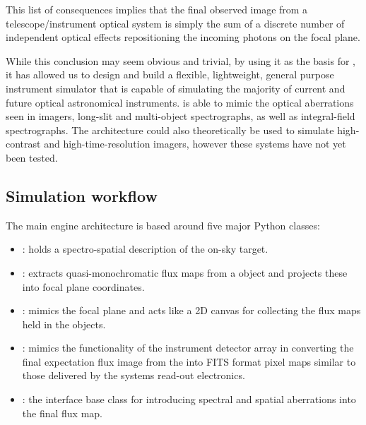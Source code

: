 This list of consequences implies that the final observed image from a telescope/instrument optical system is simply the sum of a discrete number of independent optical effects repositioning the incoming photons on the focal plane.

While this conclusion may seem obvious and trivial, by using it as the basis for \ScopeSim{}, it has allowed us to design and build a flexible, lightweight, general purpose instrument simulator that is capable of simulating the majority of current and future optical astronomical instruments.
\ScopeSim{} is able to mimic the optical aberrations seen in imagers, long-slit and multi-object spectrographs, as well as integral-field spectrographs.
The architecture could also theoretically be used to simulate high-contrast and high-time-resolution imagers, however these systems have not yet been tested.


\subsection{Simulation workflow}
\label{simulation-workflow}

The main \ScopeSim{} engine architecture is based around five major Python classes:

\begin{itemize}
\item \textbf{\Source{}}: holds a spectro-spatial description of the on-sky target.

\item \textbf{\FieldOfView{}}: extracts quasi-monochromatic flux maps from a \Source{} object and projects these into focal plane coordinates.

\item \textbf{\ImagePlane{}}: mimics the focal plane and acts like a 2D canvas for collecting the flux maps held in the \FieldOfView{} objects.

\item \textbf{\DetectorArray}: mimics the functionality of the instrument detector array in converting the final expectation flux image from the \ImagePlane{} into FITS format pixel maps similar to those delivered by the systems read-out electronics.

\item \textbf{\Effect{}}: the interface base class for introducing spectral and spatial aberrations into the final flux map.
\end{itemize}

